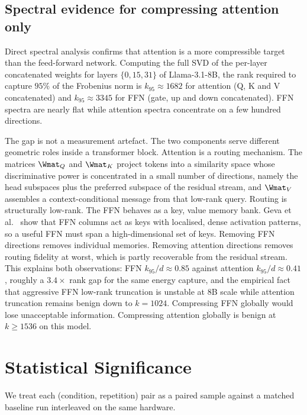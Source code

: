 \documentclass[11pt]{article}
\begin{document}
\subsection{Spectral evidence for compressing attention only}
\label{sec:spectra}
Direct spectral analysis confirms that attention is a more compressible
target than the feed-forward network. Computing the full SVD of the
per-layer concatenated weights for layers $\{0,15,31\}$ of Llama-3.1-8B,
the rank required to capture $95\%$ of the Frobenius norm is
$k_{95}\approx1682$ for attention (Q, K and V concatenated) and
$k_{95}\approx3345$ for FFN (gate, up and down concatenated). FFN spectra
are nearly flat \cite{geva2021ffn} while attention spectra concentrate on
a few hundred directions.

The gap is not a measurement artefact. The two components serve different
geometric roles inside a transformer block. Attention is a routing
mechanism. The matrices $\Wmat_Q$ and $\Wmat_K$ project tokens into a
similarity space whose discriminative power is concentrated in a small
number of directions, namely the head subspaces plus the preferred
subspace of the residual stream, and $\Wmat_V$ assembles a
context-conditional message from that low-rank query. Routing is
structurally low-rank. The FFN behaves as a key, value memory bank.
Geva et al.\ \cite{geva2021ffn} show that FFN columns act as keys with
localised, dense activation patterns, so a useful FFN must span a
high-dimensional set of keys. Removing FFN directions removes individual
memories. Removing attention directions removes routing fidelity at
worst, which is partly recoverable from the residual stream. This
explains both observations: FFN $k_{95}/d\approx0.85$ against attention
$k_{95}/d\approx0.41$, roughly a $3.4\times$ rank gap for the same
energy capture, and the empirical fact that aggressive FFN low-rank
truncation is unstable at 8B scale while attention truncation remains
benign down to $k{=}1024$. Compressing FFN globally would lose
unacceptable information. Compressing attention globally is benign at
$k\geq1536$ on this model.
\FloatBarrier

\section{Statistical Significance}
\label{sec:stats}
We treat each (condition, repetition) pair as a paired sample against a
matched baseline run interleaved on the same hardware.
\end{document}
